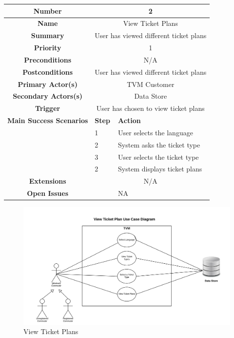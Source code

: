 \documentclass[a4paper,12pt]{report}
\begin{document}
\begin{tabular}{ | c | p{2cm} | p{7cm} |}
	
	\hline
	\textbf{Number} & \multicolumn{2}{c|}{2}  \\
	\hline
	\textbf{Name} & \multicolumn{2}{c|}{View Ticket Plans}  \\
	\hline
	\textbf{Summary} & \multicolumn{2}{c|}{User has viewed different ticket plans}  \\
	\hline
	\textbf{Priority} & \multicolumn{2}{c|}{1}  \\
	\hline
	\textbf{Preconditions} & \multicolumn{2}{c|}{N/A}  \\
	\hline
	\textbf{Postconditions} & \multicolumn{2}{c|}{User has viewed different ticket plans}  \\
	\hline
	\textbf{Primary Actor(s)} & \multicolumn{2}{c|}{TVM Customer}  \\
	\hline
	\textbf{Secondary Actors(s)} & \multicolumn{2}{c|}{Data Store}  \\
	\hline
	\textbf{Trigger} & \multicolumn{2}{c|}{User has chosen to view ticket plans}  \\
	\hline
	\textbf{Main Success Scenarios} & \textbf{Step} & \textbf{Action} \\
	\hline
	& 1 & User selects the language \\ 
	\hline
	&  2  & System asks the ticket type \\
	\hline
	&  3  & User selects the ticket type \\
	\hline
	&  2  & System displays ticket plans \\
	\hline
	\textbf{Extensions} & \multicolumn{2}{c|}{N/A}  \\
	\hline
	\textbf{Open Issues} &    & NA \\
	\hline
	
\end{tabular}

\begin{figure}[!htb]
	\includegraphics[width=1\textwidth]{Use_Case_Diagrams/ViewTicketPlan.jpeg}
	\caption{\label{fig:Use Case Model : } View Ticket Plans}	
\end{figure}
\end{document}
